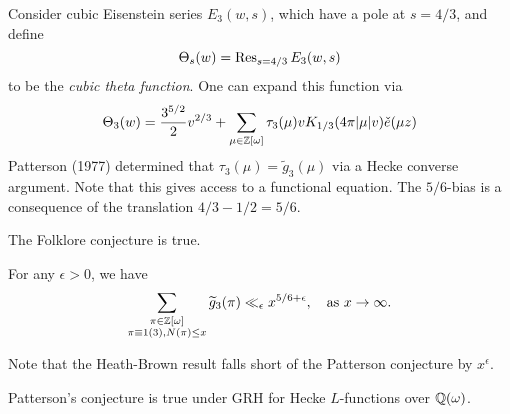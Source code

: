 \begin{example}
  Consider cubic Eisenstein series $E_3(w, s)$, which
  have a pole at $s = 4 / 3$, and define
  \[
    \Theta_s(w) = \operatorname{Res}_{s = 4 / 3} E_3(w, s)
  \]
  to be the \emph{cubic theta function}.
  One can expand this function via
  \[
    \Theta_3(w) = \frac{3^{5 / 2}}{2} v^{2 / 3}
    + \sum_{\mu \in \mathbb{Z}[\omega]} \tau_3(\mu) v K_{1 / 3} (4\pi |\mu| v) \check{e}(\mu z)
  \]
  Patterson (1977) determined that $\tau_3(\mu) = \widetilde{g}_3(\mu)$
  via a Hecke converse argument. Note that this
  gives access to a functional equation.
  The $5 / 6$-bias is a consequence of the
  translation $4 / 3 - 1 / 2 = 5 / 6$.
\end{example}

\begin{theorem}
  The Folklore conjecture is true.
\end{theorem}

\begin{theorem}
  For any $\epsilon > 0$, we have
  \[
    \sum_{\substack{\pi \in \mathbb{Z}[\omega] \\ \pi \equiv 1 (3), N(\pi) \le x}} \widetilde{g}_3(\pi)
    \ll_{\epsilon} x^{5 / 6 + \epsilon}, \quad
    \text{as $x \to \infty$}.
  \]
\end{theorem}

\begin{remark}
  Note that the Heath-Brown result falls short
  of the Patterson conjecture by $x^\epsilon$.
\end{remark}

\begin{theorem}
  Patterson's conjecture is true under GRH
  for Hecke $L$-functions over $\mathbb{Q}(\omega)$.
\end{theorem}

